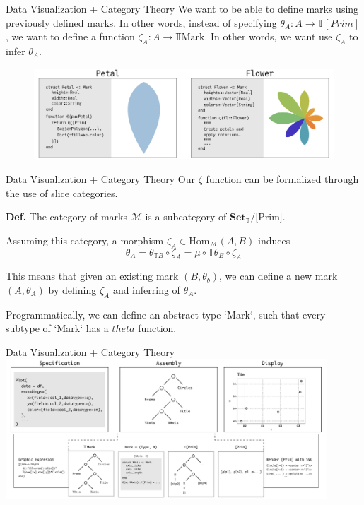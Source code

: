 \documentclass[aspectratio=169,xcolor=dvipsnames,10pt]{beamer}
\theoremstyle{definition}
\begin{document}
\begin{frame}[fragile]{Data Visualization + Category Theory}
  We want to be able to define marks using previously defined marks.
  In other words, instead of specifying $\theta_A: A \to \mathbb T [Prim]$,
  we want to define a function $\zeta_A: A \to \mathbb T \text{Mark}$. In other words,
  we want use $\zeta_A$ to infer $\theta_A$.
  \begin{figure}
    \begin{center}
        \includegraphics[width=1.0\textwidth]{./figs/petal_flower.pdf}
    \end{center}
  \end{figure}
\end{frame}

\begin{frame}[fragile]{Data Visualization + Category Theory}
  Our $\zeta$ function can be formalized through the use
  of slice categories.

  \vspace{3mm}

  \textbf{Def.} The category of marks $\mathcal M$ is
  a subcategory of  $\textbf{Set}_\mathbb T \slash \text{[Prim]}$.

  \vspace{3mm}

  Assuming this category, a morphism
  $\zeta_A \in \text{Hom}_\mathcal{M}(A, B)$ induces
  $$\theta_A = \theta_{\mathbb T B} \circ \zeta_A = \mu \circ \mathbb T \theta_B \circ \zeta_A$$


  This means that given an existing mark $(B, \theta_b)$, we can
  define a new mark $(A, \theta_A)$ by defining $\zeta_A$ and inferring
  of $\theta_A$.

  \vspace{3mm}

  Programmatically, we can define an abstract type `Mark`, such
  that every subtype of `Mark` has a $theta$ function.
\end{frame}

\begin{frame}[fragile]{Data Visualization + Category Theory}
    \centering
    \includegraphics[width=0.9\textwidth]{figs/pipe.pdf}
\end{frame}
\end{document}
